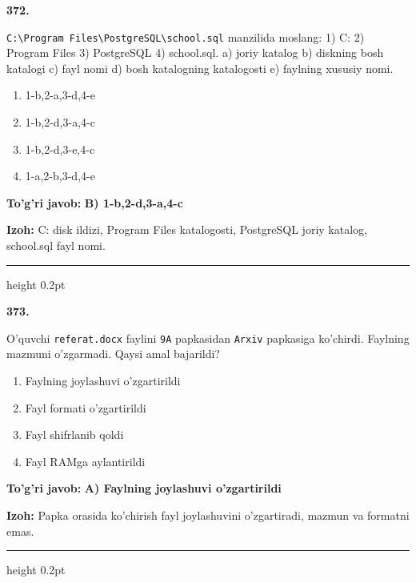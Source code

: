 \documentclass[10pt,a4paper]{article}
\begin{document}
{\bfseries\sffamily\color{ink} 372.}
\par
\texttt{C:\textbackslash{}Program Files\textbackslash{}PostgreSQL\textbackslash{}school.sql} manzilida moslang: 1) C: 2) Program Files 3) PostgreSQL 4) school.sql. a) joriy katalog b) diskning bosh katalogi c) fayl nomi d) bosh katalogning katalogosti e) faylning xususiy nomi.
\begin{enumerate}[label=\Alph*),leftmargin=9mm]
\item 1-b,2-a,3-d,4-e
\item 1-b,2-d,3-a,4-c
\item 1-b,2-d,3-e,4-c
\item 1-a,2-b,3-d,4-e
\end{enumerate}
\begin{tcolorbox}[enhanced,breakable,colback=teal!4,colframe=teal!60!black,boxrule=0.45pt,arc=1.2mm,left=2.7mm,right=2.7mm,top=1.8mm,bottom=1.8mm,before skip=2mm,after skip=2mm]
{\bfseries\sffamily\color{teal}To'g'ri javob:} \textbf{B) 1-b,2-d,3-a,4-c}
\par\smallskip
{\bfseries Izoh:} C: disk ildizi, Program Files katalogosti, PostgreSQL joriy katalog, school.sql fayl nomi.
\end{tcolorbox}
\vspace{2mm}\hrule height 0.2pt\vspace{3mm}

{\bfseries\sffamily\color{ink} 373.}
\par
O'quvchi \texttt{referat.docx} faylini \texttt{9A} papkasidan \texttt{Arxiv} papkasiga ko'chirdi. Faylning mazmuni o'zgarmadi. Qaysi amal bajarildi?
\begin{enumerate}[label=\Alph*),leftmargin=9mm]
\item Faylning joylashuvi o'zgartirildi
\item Fayl formati o'zgartirildi
\item Fayl shifrlanib qoldi
\item Fayl RAMga aylantirildi
\end{enumerate}
\begin{tcolorbox}[enhanced,breakable,colback=teal!4,colframe=teal!60!black,boxrule=0.45pt,arc=1.2mm,left=2.7mm,right=2.7mm,top=1.8mm,bottom=1.8mm,before skip=2mm,after skip=2mm]
{\bfseries\sffamily\color{teal}To'g'ri javob:} \textbf{A) Faylning joylashuvi o'zgartirildi}
\par\smallskip
{\bfseries Izoh:} Papka orasida ko'chirish fayl joylashuvini o'zgartiradi, mazmun va formatni emas.
\end{tcolorbox}
\vspace{2mm}\hrule height 0.2pt\vspace{3mm}
\end{document}
